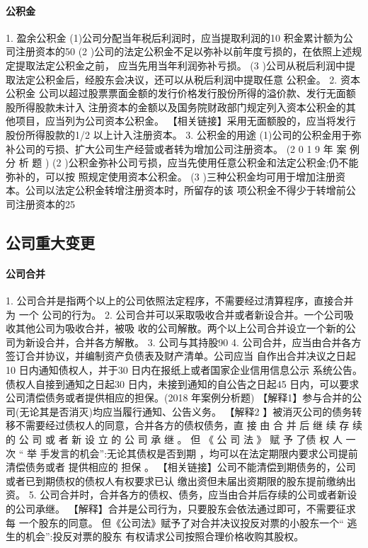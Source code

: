 \documentclass[UTF8,12pt]{ctexart}
\numberwithin{equation}{section} %
\numberwithin{figure}{section}
\numberwithin{table}{section}
\begin{document}
	\paragraph{公积金}
	1. 盈余公积金 (1)公司分配当年税后利润时，应当提取利润的10%
	积金累计额为公司注册资本的50%
	(2 )公司的法定公积金不足以弥补以前年度亏损的，在依照上述规定提取法定公积金之前， 应当先用当年利润弥补亏损。
	(3 )公司从税后利润中提取法定公积金后，经股东会决议，还可以从税后利润中提取任意 公积金。
	2. 资本公积金 公司以超过股票票面金额的发行价格发行股份所得的溢价款、发行无面额股所得股款未计入 注册资本的金额以及国务院财政部门规定列入资本公积金的其他项目，应当列为公司资本公积金。 【相关链接】采用无面额股的，应当将发行股份所得股款的1/2 以上计入注册资本。
	3. 公积金的用途 (1)公司的公积金用于弥补公司的亏损、扩大公司生产经营或者转为增加公司注册资本。 (2 0 1 9 年 案 例 分 析 题 )
	(2 )公积金弥补公司亏损，应当先使用任意公积金和法定公积金;仍不能弥补的，可以按 照规定使用资本公积金。
	(3 )三种公积金均可用于增加注册资本。公司以法定公积金转增注册资本时，所留存的该 项公积金不得少于转增前公司注册资本的25%
	
	
	\subsection{公司重大变更}
	
	\paragraph{公司合并}
	1. 公司合并是指两个以上的公司依照法定程序，不需要经过清算程序，直接合并为 一个 公司的行为。
	2. 公司合并可以采取吸收合并或者新设合并。一个公司吸收其他公司为吸收合并，被吸 收的公司解散。两个以上公司合并设立一个新的公司为新设合并，合并各方解散。
	3. 公司与其持股90%
	4. 公司合并，应当由合并各方签订合并协议，并编制资产负债表及财产清单。公司应当 自作出合并决议之日起10 日内通知债权人，并于30 日内在报纸上或者国家企业信用信息公示 系统公告。债权人自接到通知之日起30 日内，未接到通知的自公告之日起45 日内，可以要求 公司清偿债务或者提供相应的担保。(2018 年案例分析题)
	【解释1】参与合并的公司(无论其是否消灭)均应当履行通知、公告义务。
	【解释2 】被消灭公司的债务转移不需要经过债权人的同意，合并各方的债权债务，直 接 由 合 并 后 继 续 存 续 的 公 司 或 者 新 设 立 的 公 司 承 继 。 但 《 公 司 法 》 赋 予 了债 权 人 一次 “ 举 手发言的机会”:无论其债权是否到期 ，均可以在法定期限内要求公司提前清偿债务或者 提供相应的 担保 。
	【相关链接】公司不能清偿到期债务的，公司或者已到期债权的债权人有权要求已认 缴出资但未届出资期限的股东提前缴纳出资。
	5. 公司合并时，合并各方的债权、债务，应当由合并后存续的公司或者新设的公司承继。 【解释】合并是公司行为，只要股东会依法通过即可，不需要征求每 一个股东的同意。 但《公司法》赋予了对合并决议投反对票的小股东一个“ 逃生的机会”:投反对票的股东 有权请求公司按照合理价格收购其股权。
	
\end{document}

